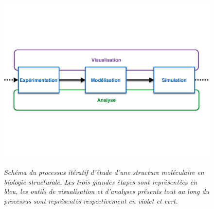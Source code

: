 \begin{figure}[h]
  \centering
  {\includegraphics[width=\linewidth]{./figures/ch1/process_bio_struct}}
    \caption[]{\it Schéma du processus itératif d'étude d'une structure moléculaire en biologie structurale. Les trois grandes étapes sont représentées en bleu, les outils de visualisation et d'analyses présents tout au long du processus sont représentés respectivement en violet et vert.}
  \label{Fig:process_bio_struct}
  \hspace{0.2cm}
\end{figure}

